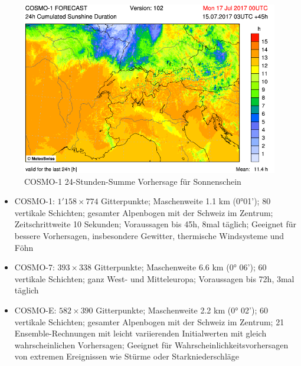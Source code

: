 \begin{refsection}
\begin{figure}
\centering
\includegraphics[width=\hsize]{klima/cosmo1.png}
\caption{COSMO-1 24-Stunden-Summe Vorhersage für Sonnenschein \cite{klima:meteoschweiz}
\label{klima:wettervorhersagen:cosmo}}
\end{figure}

\begin{itemize}
\item COSMO-1: $1'158 \times 774$ Gitterpunkte; Maschenweite 1.1 km (0°01'); 80 vertikale Schichten; gesamter Alpenbogen mit der Schweiz im Zentrum; Zeitschrittweite 10 Sekunden; Voraussagen bis 45h, 8mal täglich; Geeignet für bessere Vorhersagen, insbesondere Gewitter, thermische Windsysteme und Föhn \cite{klima:meteoschweiz}
\item COSMO-7: $393 \times 338$ Gitterpunkte; Maschenweite 6.6 km (0° 06'); 60 vertikale Schichten; ganz West- und Mitteleuropa; Voraussagen bis 72h, 3mal täglich \cite{klima:meteoschweiz} 
\item COSMO-E: $582 \times 390$ Gitterpunkte; Maschenweite 2.2 km (0° 02'); 60 vertikale Schichten; gesamter Alpenbogen mit der Schweiz im Zentrum; 21 Ensemble-Rechnungen mit leicht variierenden Initialwerten mit gleich wahrscheinlichen Vorhersagen; Geeignet für Wahrscheinlichkeitsvorhersagen von extremen Ereignissen wie Stürme oder Starkniederschläge \cite{klima:meteoschweiz} 
\end{itemize}



\end{refsection}
